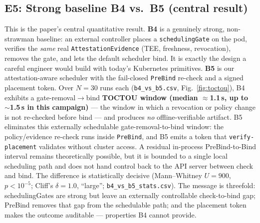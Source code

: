 \subsection{E5: Strong baseline B4 vs.\ B5 (central result)}
\label{sec:e4}
This is the paper's central quantitative result. \textbf{B4} is a genuinely
strong, non-strawman baseline: an external controller places a
\texttt{schedulingGate} on the pod, verifies the \emph{same} real
\texttt{AttestationEvidence} (TEE, freshness, revocation), removes the gate, and
lets the default scheduler bind. It is exactly the design a careful engineer
would build with today's Kubernetes primitives. \textbf{B5} is our
attestation-aware scheduler with the fail-closed \texttt{PreBind} re-check and a
signed placement token. Over $N{=}30$ runs each (\texttt{b4\_vs\_b5.csv},
Fig.~\ref{fig:toctou}), B4 exhibits a gate-removal$\to$bind \textbf{TOCTOU window
(median $\approx$1.1\,s, up to $\sim$1.5\,s in this campaign)} --- the window in which a revocation
or policy change is not re-checked before bind --- and produces \emph{no}
offline-verifiable artifact. B5 eliminates this externally schedulable
gate-removal-to-bind window: the policy/evidence re-check runs inside
\texttt{PreBind}, and B5 emits a token that \texttt{verify-placement} validates
without cluster access. A residual in-process PreBind-to-Bind interval remains
theoretically possible, but it is bounded to a single local scheduling path and
does not hand control back to the API server between check and bind. The
difference is statistically decisive (Mann--Whitney $U{=}900$, $p<10^{-5}$;
Cliff's $\delta{=}1.0$, ``large''; \texttt{b4\_vs\_b5\_stats.csv}). The message is
threefold: schedulingGates are strong but leave an externally controllable
check-to-bind gap; PreBind removes that gap from the schedulable path; and the
placement token makes the outcome auditable --- properties B4 cannot provide.

